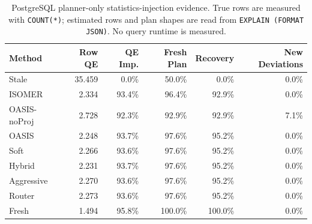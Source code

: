 \begin{table}[t]
  \centering
  \small
  \caption{PostgreSQL planner-only statistics-injection evidence. True rows are measured with \texttt{COUNT(*)}; estimated rows and plan shapes are read from \texttt{EXPLAIN (FORMAT JSON)}. No query runtime is measured.}
  \label{tab:postgres_planner_stats_injection}
  \setlength{\tabcolsep}{4pt}
  \begin{tabular}{lrrrrr}
    \toprule
    Method & Row QE & QE Imp. & Fresh Plan & Recovery & New Deviations \\
    \midrule
    Stale & 35.459 & 0.0\% & 50.0\% & 0.0\% & 0.0\% \\
    ISOMER & 2.334 & 93.4\% & 96.4\% & 92.9\% & 0.0\% \\
    OASIS-noProj & 2.728 & 92.3\% & 92.9\% & 92.9\% & 7.1\% \\
    OASIS & 2.248 & 93.7\% & 97.6\% & 95.2\% & 0.0\% \\
    Soft & 2.266 & 93.6\% & 97.6\% & 95.2\% & 0.0\% \\
    Hybrid & 2.231 & 93.7\% & 97.6\% & 95.2\% & 0.0\% \\
    Aggressive & 2.270 & 93.6\% & 97.6\% & 95.2\% & 0.0\% \\
    Router & 2.273 & 93.6\% & 97.6\% & 95.2\% & 0.0\% \\
    Fresh & 1.494 & 95.8\% & 100.0\% & 100.0\% & 0.0\% \\
    \bottomrule
  \end{tabular}
\end{table}
